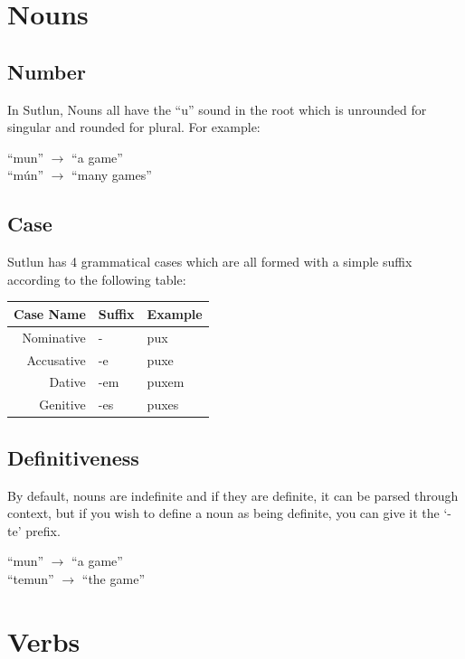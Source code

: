 \documentclass{book}
\begin{document}
\section{Nouns}
\subsection{Number}
In Sutlun, Nouns all have the ``u'' sound in the root which is unrounded for singular and rounded for plural.
For example:

\begin{center}
    ``mun'' $\rightarrow$ ``a game'' \\
    ``mún'' $\rightarrow$ ``many games''
\end{center}

\subsection{Case}
Sutlun has 4 grammatical cases which are all formed with a simple suffix according to the following table:

\begin{center}
    \begin{tabular}{|r|l|l|}
        \hline
        Case Name   & Suffix    & Example \\
        \hline
        Nominative  & -         & pux \\
        Accusative  & -e        & puxe \\
        Dative      & -em       & puxem \\
        Genitive    & -es       & puxes \\
        \hline
    \end{tabular}
\end{center}

\subsection{Definitiveness}
By default, nouns are indefinite and if they are definite, it can be parsed through context,
but if you wish to define a noun as being definite, you can give it the `-te' prefix.

\begin{center}
    ``mun'' $\rightarrow$ ``a game'' \\
    ``temun'' $\rightarrow$ ``the game''
\end{center}


\section{Verbs}
\end{document}
